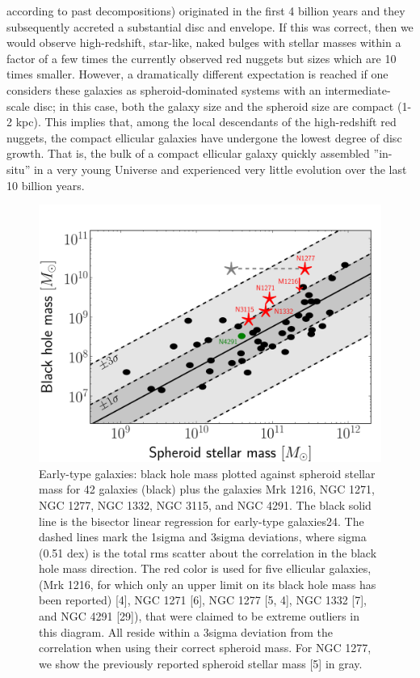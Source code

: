 \documentclass[useAMS,usenatbib,article]{mn2e}
\begin{document}
according to past decompositions) originated in the first 4 billion years 
and they subsequently accreted a substantial disc and envelope. 
If this was correct, then we would observe high-redshift, star-like, naked bulges with stellar masses 
within a factor of a few times the currently observed red nuggets but sizes which are 10 times smaller. 
However, a dramatically different expectation is reached 
if one considers these galaxies as spheroid-dominated systems with an intermediate-scale disc; 
in this case, both the galaxy size and the spheroid size are compact (1-2 kpc). 
This implies that, among the local descendants of the high-redshift red nuggets, 
the compact ellicular galaxies have undergone the lowest degree of disc growth. 
That is, the bulk of a compact ellicular galaxy quickly assembled ''in-situ'' in a very young Universe 
and experienced very little evolution over the last 10 billion years.

\begin{figure}
\begin{center}
\includegraphics[width=\columnwidth]{images/mm.pdf}
\caption{Early-type galaxies: black hole mass plotted against spheroid stellar mass for 42 galaxies (black) plus the galaxies Mrk 1216, NGC 1271, NGC 1277, NGC 1332, NGC 3115, and NGC 4291. The black solid line is the bisector linear regression for early-type galaxies24. The dashed lines mark the 1sigma and 3sigma deviations, where sigma (0.51 dex) is the total rms scatter about the correlation in the black hole mass direction. The red color is used for five ellicular galaxies, (Mrk 1216, for which only an upper limit on its black hole mass has been reported) [4], NGC 1271 [6], NGC 1277 [5, 4], NGC 1332 [7], and NGC 4291 [29]), that were claimed to be extreme outliers in this diagram. All reside within a 3sigma deviation from the correlation when using their correct spheroid mass. For NGC 1277, we show the previously reported spheroid stellar mass [5] in gray.}
\label{fig:mm}
\end{center}
\end{figure}
\end{document}
